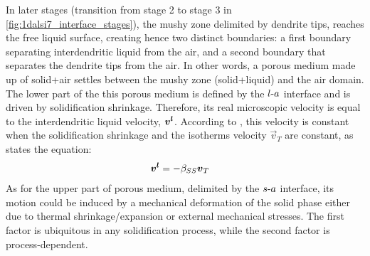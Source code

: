 In later stages (transition from stage 2 to stage 3 in \cref{fig:1dalsi7_interface_stages}), the mushy zone delimited by dendrite tips, 
reaches the free liquid surface, creating hence two distinct boundaries: 
a first boundary separating interdendritic liquid from the air, and a second boundary that separates the dendrite tips from the air.
In other words, a porous medium made up of solid+air settles between the mushy zone (solid+liquid) and the air domain. The lower part of the this porous medium is defined by the $l\text{-}a$ interface and is driven by solidification shrinkage.
Therefore, its real microscopic velocity is equal to the interdendritic liquid velocity, $\boldsymbol{v^l}$. 
According to \citet{dantzig_solidification_2009},
this velocity is constant when the solidification shrinkage and the isotherms velocity $\vec{v}_T$ are constant, as states the equation:
\begin{align}
\label{eq:real_velocity}
& \boldsymbol{v^l} = -\beta_{SS} \boldsymbol{v}_T
\end{align}
As for the upper part of porous medium, delimited by the $s\text{-}a$ interface, its motion could be induced by a mechanical deformation of the solid phase either due to thermal shrinkage/expansion or external mechanical stresses.
The first factor is ubiquitous in any solidification process, while the second factor is process-dependent. 

